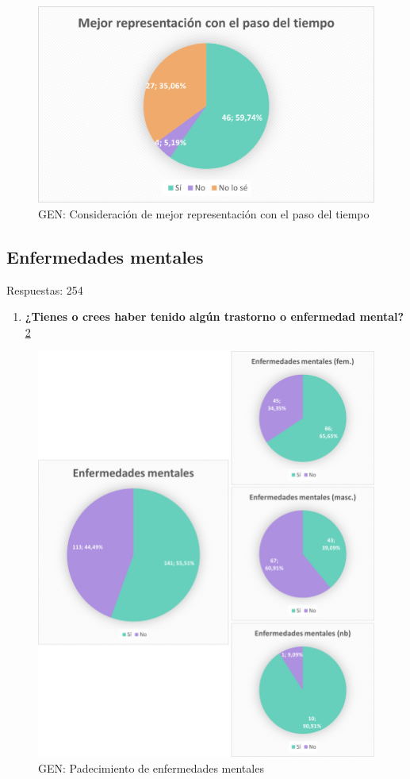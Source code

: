 \documentclass[12pt, a4paper,twoside,titlepage]{book}
\begin{document}
\begin{figure}
    \centering
    \includegraphics[width=.8\linewidth]{ANEXO Gen/20AnexGENMejor}
    \caption{GEN: Consideración de mejor representación con el paso del tiempo}
    \label{fig:GENMejor}
\end{figure}




\subsection{Enfermedades mentales}
Respuestas: 254
\begin{enumerate}[label=\textbf{\arabic*}.]
     \item \textbf{¿Tienes o crees haber tenido algún trastorno o enfermedad mental? }\\
     \ref{fig:GENEnf}
\end{enumerate}


\begin{figure}
    \centering
    \includegraphics[width=1\linewidth]{ANEXO Gen/21AnexGENEnf}
    \caption{GEN: Padecimiento de enfermedades mentales}
    \label{fig:GENEnf}
\end{figure}
\end{document}
